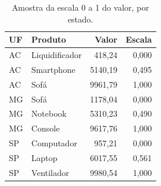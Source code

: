 \begin{table}[H]
    \centering
    \caption{Amostra da escala 0 a 1 do valor, por estado.}
    \label{tab:q6-amostra}
    \footnotesize
    \setlength{\tabcolsep}{4pt}
    \begin{tabular}{@{}llrr@{}}
        \toprule
        UF & Produto & Valor & Escala \\
        \midrule
        AC & Liquidificador &  418,24 & 0,000 \\
        AC & Smartphone     & 5140,19 & 0,495 \\
        AC & Sofá           & 9961,79 & 1,000 \\
        MG & Sofá           & 1178,04 & 0,000 \\
        MG & Notebook       & 5310,23 & 0,490 \\
        MG & Console        & 9617,76 & 1,000 \\
        SP & Computador     &  957,21 & 0,000 \\
        SP & Laptop         & 6017,55 & 0,561 \\
        SP & Ventilador     & 9980,54 & 1,000 \\
        \bottomrule
    \end{tabular}
\end{table}

